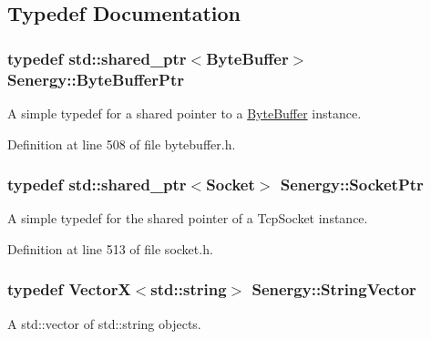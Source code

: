 \subsection{Typedef Documentation}
\hypertarget{namespace_senergy_a30f5cfaeb333ffdf2c3332cc590a57ea}{
\subsubsection[{Byte\-Buffer\-Ptr}]{\setlength{\rightskip}{0pt plus 5cm}typedef std\-::shared\-\_\-ptr$<${\bf Byte\-Buffer}$>$ {\bf Senergy\-::\-Byte\-Buffer\-Ptr}}}\label{namespace_senergy_a30f5cfaeb333ffdf2c3332cc590a57ea}


A simple typedef for a shared pointer to a \hyperlink{class_senergy_1_1_byte_buffer}{Byte\-Buffer} instance. 



Definition at line 508 of file bytebuffer.\-h.

\hypertarget{namespace_senergy_a9014e48a368555ba932efd8d17eb2d23}{
\subsubsection[{Socket\-Ptr}]{\setlength{\rightskip}{0pt plus 5cm}typedef std\-::shared\-\_\-ptr$<${\bf Socket}$>$ {\bf Senergy\-::\-Socket\-Ptr}}}\label{namespace_senergy_a9014e48a368555ba932efd8d17eb2d23}


A simple typedef for the shared pointer of a Tcp\-Socket instance. 



Definition at line 513 of file socket.\-h.

\hypertarget{namespace_senergy_a09aea2e19671645414361ca8388aebfe}{
\subsubsection[{String\-Vector}]{\setlength{\rightskip}{0pt plus 5cm}typedef {\bf Vector\-X}$<$std\-::string$>$ {\bf Senergy\-::\-String\-Vector}}}\label{namespace_senergy_a09aea2e19671645414361ca8388aebfe}


A std\-::vector of std\-::string objects. 



